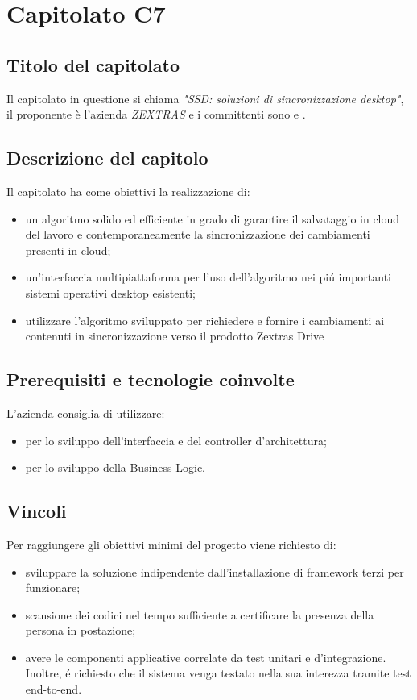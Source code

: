 \section{Capitolato C7}
\subsection{Titolo del capitolato}
Il capitolato in questione si chiama \textit{"SSD: soluzioni di sincronizzazione desktop"}, il proponente \`e l'azienda \textit{ZEXTRAS} e i committenti sono \VT{} e \CR{}.

\subsection{Descrizione del capitolo}
Il capitolato ha come obiettivi la realizzazione di:
\begin{itemize}
\item un algoritmo solido ed efficiente in grado di garantire il salvataggio in cloud del lavoro e contemporaneamente la sincronizzazione dei cambiamenti presenti in cloud;
\item un’interfaccia multipiattaforma per l’uso dell’algoritmo nei pi\'u importanti sistemi operativi desktop esistenti;
\item utilizzare l’algoritmo sviluppato per richiedere e fornire i cambiamenti ai contenuti in sincronizzazione verso il prodotto Zextras Drive
\end{itemize}

\subsection{Prerequisiti e tecnologie coinvolte}
L'azienda consiglia di utilizzare:

\begin{itemize}
\item {} per lo sviluppo dell'interfaccia e del controller d'architettura;
\item {} per lo sviluppo della Business Logic.
\end{itemize}

\subsection{Vincoli}
Per raggiungere gli obiettivi minimi del progetto viene richiesto di:

\begin{itemize}
\item sviluppare la soluzione indipendente dall'installazione di framework terzi per funzionare;
\item scansione dei codici nel tempo sufficiente a certificare la presenza della persona in postazione; 
\item avere le componenti applicative correlate da test unitari e d’integrazione. Inoltre, \'e richiesto che il sistema venga testato nella sua interezza tramite test end-to-end.
\end{itemize}

